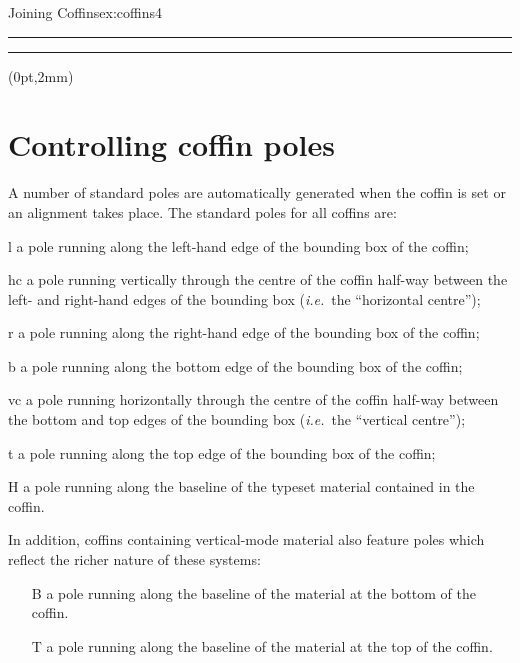 \begin{texexample}{Joining Coffins}{ex:coffins4}
\SetHorizontalCoffin\ExampleCoffin
   {\color{red}\rule{3cm}{1pc}} 
\SetHorizontalCoffin\ExampleCoffinTwo
   {\color{green}\rule{3cm}{1pc}}    
\JoinCoffins\Result\ExampleCoffin   
\JoinCoffins*{} \ExampleCoffinTwo [t,l](0pt,2mm)
\TypesetCoffin\Result
\end{texexample}   
   
\section{Controlling coffin poles}

 A number of standard poles are automatically generated when the coffin
 is set or an alignment takes place. The standard poles for all coffins
 are:
 \begin{marglist}
   \item[l] a pole running along the left-hand edge of the bounding
     box of the coffin;
   \item[hc] a pole running vertically through the centre of the coffin
     half-way between the left- and right-hand edges of the bounding
       box (\emph{i.e.}~the \enquote{horizontal centre});
   \item[r] a pole running along the right-hand edge of the bounding
     box of the coffin;
   \item[b] a pole running along the bottom edge of the bounding
     box of the coffin;
   \item[vc] a pole running horizontally through the centre of the
     coffin half-way between the bottom and top edges of the bounding
     box (\emph{i.e.}~the \enquote{vertical centre});
   \item[t] a pole running along the top edge of the bounding
     box of the coffin;
   \item[H] a pole running along the baseline of the typeset material
     contained in the coffin.
 \end{marglist}
 In addition, coffins containing vertical-mode material also
 feature poles which reflect the richer nature of these systems:
 \begin{itemize}
   \item[B] a pole running along the baseline of the material at the
     bottom of the coffin.
   \item[T] a pole running along the baseline of the material at the top
     of the coffin.
 \end{itemize}  
 
